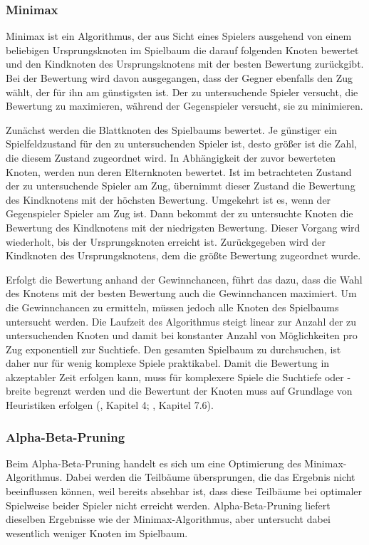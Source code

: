 \subsubsection{Minimax}

Minimax ist ein Algorithmus, der aus Sicht eines Spielers ausgehend von einem beliebigen Ursprungsknoten im Spielbaum die darauf folgenden Knoten bewertet und den Kindknoten des Ursprungsknotens mit der besten Bewertung zurückgibt. Bei der Bewertung wird davon ausgegangen, dass der Gegner ebenfalls den Zug wählt, der für ihn am günstigsten ist. Der zu untersuchende Spieler versucht, die Bewertung zu maximieren, während der Gegenspieler versucht, sie zu minimieren.

Zunächst werden die Blattknoten des Spielbaums bewertet. Je günstiger ein Spielfeldzustand für den zu untersuchenden Spieler ist, desto größer ist die Zahl, die diesem Zustand zugeordnet wird. In Abhängigkeit der zuvor bewerteten Knoten, werden nun deren Elternknoten bewertet. Ist im betrachteten Zustand der zu untersuchende Spieler am Zug, übernimmt dieser Zustand die Bewertung des Kindknotens mit der höchsten Bewertung. Umgekehrt ist es, wenn der Gegenspieler Spieler am Zug ist. Dann bekommt der zu untersuchte Knoten die Bewertung des Kindknotens mit der niedrigsten Bewertung. Dieser Vorgang wird wiederholt, bis der Ursprungsknoten erreicht ist. Zurückgegeben wird der Kindknoten des Ursprungsknotens, dem die größte Bewertung zugeordnet wurde.

Erfolgt die Bewertung anhand der Gewinnchancen, führt das dazu, dass die Wahl des Knotens mit der besten Bewertung auch die Gewinnchancen maximiert. Um die Gewinnchancen zu ermitteln, müssen jedoch alle Knoten des Spielbaums untersucht werden. Die Laufzeit des Algorithmus steigt linear zur Anzahl der zu untersuchenden Knoten und damit bei konstanter Anzahl von Möglichkeiten pro Zug exponentiell zur Suchtiefe. Den gesamten Spielbaum zu durchsuchen, ist daher nur für wenig komplexe Spiele praktikabel. Damit die Bewertung in akzeptabler Zeit erfolgen kann, muss für komplexere Spiele die Suchtiefe oder -breite begrenzt werden und die Bewertunt der Knoten muss auf Grundlage von Heuristiken erfolgen (\cite{Ferguson.January2019}, Kapitel 4; \cite{Heineman.October2008}, Kapitel 7.6).

\subsubsection{Alpha-Beta-Pruning}

Beim Alpha-Beta-Pruning handelt es sich um eine Optimierung des Minimax-Algorithmus. Dabei werden die Teilbäume übersprungen, die das Ergebnis nicht beeinflussen können, weil bereits absehbar ist, dass diese Teilbäume bei optimaler Spielweise beider Spieler nicht erreicht werden. Alpha-Beta-Pruning liefert dieselben Ergebnisse wie der Minimax-Algorithmus, aber untersucht dabei wesentlich weniger Knoten im Spielbaum.

